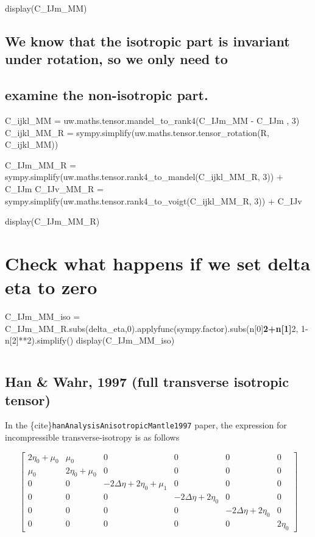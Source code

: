 \documentclass[
  letterpaper,
  DIV=11,
  numbers=noendperiod]{scrreprt}
\begin{document}
display(C\_IJm\_MM)

\section{We know that the isotropic part is invariant under rotation, so
we only need
to}\label{we-know-that-the-isotropic-part-is-invariant-under-rotation-so-we-only-need-to}

\section{examine the non-isotropic
part.}\label{examine-the-non-isotropic-part.}

C\_ijkl\_MM = uw.maths.tensor.mandel\_to\_rank4(C\_IJm\_MM - C\_IJm , 3)
C\_ijkl\_MM\_R = sympy.simplify(uw.maths.tensor.tensor\_rotation(R,
C\_ijkl\_MM))

C\_IJm\_MM\_R =
sympy.simplify(uw.maths.tensor.rank4\_to\_mandel(C\_ijkl\_MM\_R, 3)) +
C\_IJm C\_IJv\_MM\_R =
sympy.simplify(uw.maths.tensor.rank4\_to\_voigt(C\_ijkl\_MM\_R, 3)) +
C\_IJv

display(C\_IJm\_MM\_R)

\chapter{Check what happens if we set delta eta to
zero}\label{check-what-happens-if-we-set-delta-eta-to-zero}

C\_IJm\_MM\_iso =
C\_IJm\_MM\_R.subs(delta\_eta,0).applyfunc(sympy.factor).subs(n{[}0{]}\textbf{2+n{[}1{]}}2,
1-n{[}2{]}**2).simplify() display(C\_IJm\_MM\_iso)

\begin{verbatim}
\end{verbatim}

\section{Han \& Wahr, 1997 (full transverse isotropic
tensor)}\label{han-wahr-1997-full-transverse-isotropic-tensor}

In the \{cite\}\texttt{hanAnalysisAnisotropicMantle1997} paper, the
expression for incompressible transverse-isotropy is as follows

\[\left[\begin{matrix}2 \eta_{0} + \mu_{0} & \mu_{0} & 0 & 0 & 0 & 0\\\mu_{0} & 2 \eta_{0} + \mu_{0} & 0 & 0 & 0 & 0\\0 & 0 & - 2 \Delta\eta + 2 \eta_{0} + \mu_{1} & 0 & 0 & 0\\0 & 0 & 0 & - 2 \Delta\eta + 2 \eta_{0} & 0 & 0\\0 & 0 & 0 & 0 & - 2 \Delta\eta + 2 \eta_{0} & 0\\0 & 0 & 0 & 0 & 0 & 2 \eta_{0}\end{matrix}\right]\]
\end{document}
